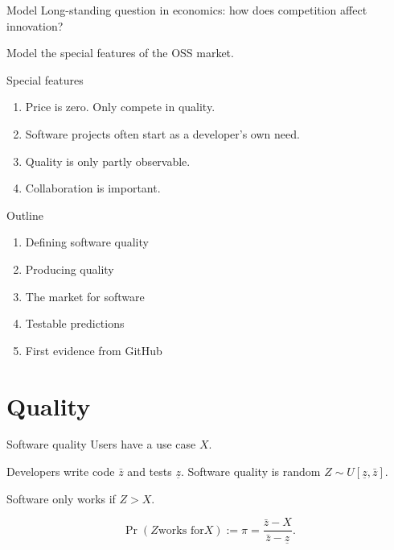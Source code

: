 \documentclass[
  ignorenonframetext,
  aspectratio=1610,
]{beamer}
\providecommand{\tightlist}{%
  \setlength{\itemsep}{0pt}\setlength{\parskip}{0pt}}
\begin{document}
\begin{frame}{Model}
\label{model}
Long-standing question in economics: how does competition affect
innovation?

Model the special features of the OSS market.
\end{frame}

\begin{frame}{Special features}
\label{special-features}
\begin{enumerate}
\tightlist
\item
  Price is zero. Only compete in quality.
\item
  Software projects often start as a developer's own need.
\item
  Quality is only partly observable.
\item
  Collaboration is important.
\end{enumerate}
\end{frame}

\begin{frame}{Outline}
\label{outline}
\begin{enumerate}
\tightlist
\item
  Defining software quality
\item
  Producing quality
\item
  The market for software
\item
  Testable predictions
\item
  First evidence from GitHub
\end{enumerate}
\end{frame}

\section{Quality}\label{quality}

\begin{frame}{Software quality}
\label{software-quality}
Users have a use case \(X\).

Developers write code \(\bar z\) and tests \(\underline z\). Software
quality is random \(Z \sim U[\underline z, \bar z]\).

Software only works if \(Z > X\).

\[
\Pr(Z \text{works for} X) := \pi = \frac{\bar z - X}{\bar z - \underline z}.
\]
\end{frame}
\end{document}
